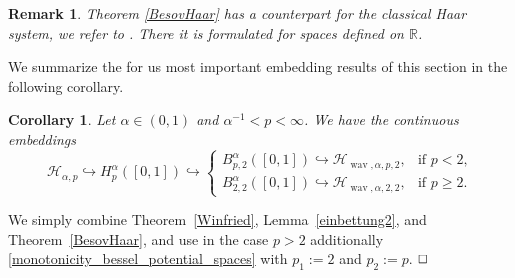 \documentclass[12pt]{article}
\DeclareMathOperator{\wav}{wav}
\newtheorem{corollary}{Corollary}
\newtheorem{remark}{Remark}
\newenvironment{proof}{\begin{trivlist}
    \item[\hskip\labelsep{\it Proof.}]}{$\hfill\Box$\end{trivlist}}
\newcommand{\real}{\mathbb{R}}
\newcommand{\HH}{\mathcal{H}}
\begin{document}
\begin{remark}
 \rm
 Theorem \ref{BesovHaar} has a counterpart for the classical Haar system, we refer to 
 \cite[Prop.~2.37]{Tri10}.
 There it is formulated for spaces defined on $\real$.
 \end{remark}

We summarize the for us most important embedding results of this section in the following corollary.

\begin{corollary}\label{DirEmb}
Let $\alpha\in (0, 1)$ and $\alpha^{-1} < p  < \infty$. We have the continuous embeddings
\begin{equation}\label{univariate_embedding_series}
\mathcal{H}_{\alpha, p} \hookrightarrow H^\alpha_{p}([0,1])
\hookrightarrow 
\begin{cases}
B^\alpha_{p, 2}([0,1]) \hookrightarrow \HH_{\wav,\alpha,p, 2}, & \text{if $p < 2$,}\\
 B^\alpha_{2, 2}([0,1]) \hookrightarrow \HH_{\wav,\alpha, 2, 2}, & \text{if $p \ge 2$.}
\end{cases}
\end{equation}
\end{corollary}

\begin{proof}
We simply combine Theorem~\ref{Winfried}, Lemma~\ref{einbettung2}, and Theorem~\ref{BesovHaar}, 
and use in the case $p > 2$ additionally \eqref{monotonicity_bessel_potential_spaces} with $p_1:=2$ and $p_2:= p$.
\end{proof}

\end{document}
